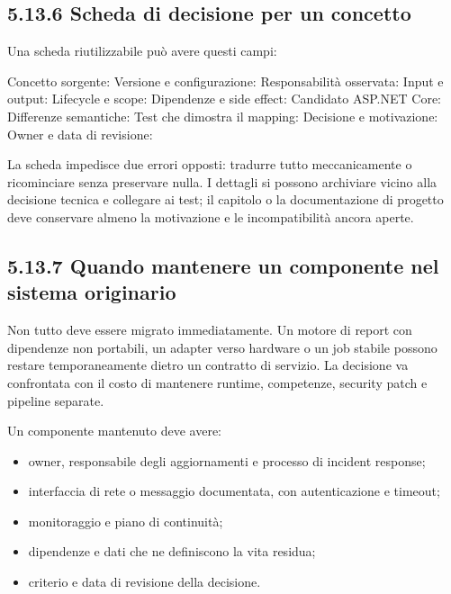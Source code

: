 \documentclass[
  italian,
  10pt,
]{book}
\newenvironment{Shaded}{\begin{snugshade}}{\end{snugshade}}
\newcommand{\NormalTok}[1]{#1}
\providecommand{\tightlist}{%
  \setlength{\itemsep}{0pt}\setlength{\parskip}{0pt}}
\begin{document}
\subsection{5.13.6 Scheda di decisione per un
concetto}\label{scheda-di-decisione-per-un-concetto}

Una scheda riutilizzabile può avere questi campi:

\begin{Shaded}
\begin{Highlighting}[]
\NormalTok{Concetto sorgente:}
\NormalTok{Versione e configurazione:}
\NormalTok{Responsabilità osservata:}
\NormalTok{Input e output:}
\NormalTok{Lifecycle e scope:}
\NormalTok{Dipendenze e side effect:}
\NormalTok{Candidato ASP.NET Core:}
\NormalTok{Differenze semantiche:}
\NormalTok{Test che dimostra il mapping:}
\NormalTok{Decisione e motivazione:}
\NormalTok{Owner e data di revisione:}
\end{Highlighting}
\end{Shaded}

La scheda impedisce due errori opposti: tradurre tutto meccanicamente o
ricominciare senza preservare nulla. I dettagli si possono archiviare
vicino alla decisione tecnica e collegare ai test; il capitolo o la
documentazione di progetto deve conservare almeno la motivazione e le
incompatibilità ancora aperte.

\subsection{5.13.7 Quando mantenere un componente nel sistema
originario}\label{quando-mantenere-un-componente-nel-sistema-originario}

Non tutto deve essere migrato immediatamente. Un motore di report con
dipendenze non portabili, un adapter verso hardware o un job stabile
possono restare temporaneamente dietro un contratto di servizio. La
decisione va confrontata con il costo di mantenere runtime, competenze,
security patch e pipeline separate.

Un componente mantenuto deve avere:

\begin{itemize}
\tightlist
\item
  owner, responsabile degli aggiornamenti e processo di incident
  response;
\item
  interfaccia di rete o messaggio documentata, con autenticazione e
  timeout;
\item
  monitoraggio e piano di continuità;
\item
  dipendenze e dati che ne definiscono la vita residua;
\item
  criterio e data di revisione della decisione.
\end{itemize}
\end{document}
